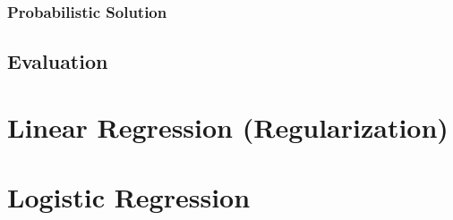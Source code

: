 \documentclass[../main.tex]{subfiles}
\begin{document}
\subsection{Probabilistic Solution}

\section{Evaluation}

\chapter{Linear Regression (Regularization)}

\chapter{Logistic Regression}
\end{document}
